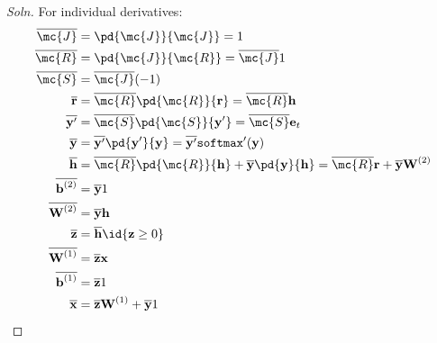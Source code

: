 \documentclass{article}
\begin{document}
	\subsubsection{}
	\begin{proof}[Soln]
		For individual derivatives:
		\begin{align}
			\overline{\mc{J}} &= \pd{\mc{J}}{\mc{J}} = 1 \\
			\overline{\mc{R}} &= \pd{\mc{J}}{\mc{R}} = \overline{\mc{J}}1 \\
			\overline{\mc{S}} &= \overline{\mc{J}} (-1) \\
			\overline{\textbf{r}} &= \overline{\mc{R}} \pd{\mc{R}}{\textbf{r}} = \overline{\mc{R}} \textbf{h} \\
			\overline{\textbf{y}'} &= \overline{\mc{S}} \pd{\mc{S}}{\textbf{y}'} = \overline{\mc{S}} \textbf{e}_t \\
			\overline{\textbf{y}} &= \overline{\textbf{y}'} \pd{\textbf{y}'}{\textbf{y}} = \overline{\textbf{y}'}\texttt{softmax}'(\textbf{y}) \\
			\overline{\textbf{h}} &= \overline{\mc{R}} \pd{\mc{R}}{\textbf{h}} + \overline{\textbf{y}} \pd{\textbf{y}}{\textbf{h}} = \overline{\mc{R}} \textbf{r} + \overline{\textbf{y}} \textbf{W}^{(2)} \\
			\overline{\textbf{b}^{(2)}} &= \overline{\textbf{y}} 1 \\
			\overline{\textbf{W}^{(2)}} &= \overline{\textbf{y}} \textbf{h} \\
			\overline{\textbf{z}} &= \overline{\textbf{h}} \id{\textbf{z} \geq 0} \\
			\overline{\textbf{W}^{(1)}} &= \overline{\textbf{z}} \textbf{x} \\
			\overline{\textbf{b}^{(1)}} &= \overline{\textbf{z}} 1 \\
			\overline{\textbf{x}} &= \overline{\textbf{z}} \textbf{W}^{(1)} + \overline{\textbf{y}} 1
		\end{align}

\end{proof}
\end{document}
